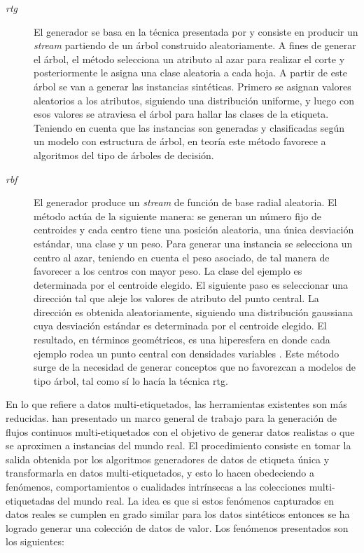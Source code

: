 \begin{description}

   \item[\textit{\acrfull{rtg}}] El generador se basa en la técnica presentada
      por \citeauthor{domingos_mining_2002} \cite{domingos_mining_2002} y
      consiste en producir un \textit{stream} partiendo de un árbol construido
      aleatoriamente. A fines de generar el árbol, el método selecciona un
      atributo al azar para realizar el corte y posteriormente le asigna una
      clase aleatoria a cada hoja. A partir de este árbol se van a generar las
      instancias sintéticas.  Primero se asignan valores aleatorios a los
      atributos, siguiendo una distribución uniforme, y luego con esos valores
      se atraviesa el árbol para hallar las clases de la etiqueta. Teniendo en
      cuenta que las instancias son generadas y clasificadas según un modelo con
      estructura de árbol, en teoría este método favorece a algoritmos del tipo
      de árboles de decisión.

   \item[\textit{\acrfull{rbf}}] El generador produce un \textit{stream} de
      función de base radial aleatoria. El método actúa de la siguiente manera:
      se generan un número fijo de centroides y cada centro tiene una posición
      aleatoria, una única desviación estándar, una clase y un peso. Para
      generar una instancia se selecciona un centro al azar, teniendo en cuenta
      el peso asociado, de tal manera de favorecer a los centros con mayor peso.
      La clase del ejemplo es determinada por el centroide elegido. El siguiente
      paso es seleccionar una dirección tal que aleje los valores de atributo
      del punto central. La dirección es obtenida aleatoriamente, siguiendo una
      distribución gaussiana cuya desviación estándar es determinada por el
      centroide elegido.  El resultado, en términos geométricos, es una
      hiperesfera en donde cada ejemplo rodea un punto central con densidades
      variables \cite{kirkby_improving_2007}. Este método surge de la necesidad
      de generar conceptos que no favorezcan a modelos de tipo árbol, tal como
      sí lo hacía la técnica \acrshort{rtg}.

\end{description}

En lo que refiere a datos multi-etiquetados, las herramientas existentes son más
reducidas. \citeauthor{read_generating_2009} han presentado un marco general
de trabajo para la generación de flujos continuos multi-etiquetados
\cite{read_generating_2009} con el objetivo de generar datos realistas o que
se aproximen a instancias del mundo real. El procedimiento consiste en tomar la
salida obtenida por los algoritmos generadores de datos de etiqueta única y
transformarla en datos multi-etiquetados, y esto lo hacen obedeciendo a
fenómenos, comportamientos o cualidades intrínsecas a las colecciones
multi-etiquetadas del mundo real. La idea es que si estos fenómenos capturados
en datos reales se cumplen en grado similar para los datos sintéticos entonces
se ha logrado generar una colección de datos de valor. Los fenómenos presentados
son los siguientes:

